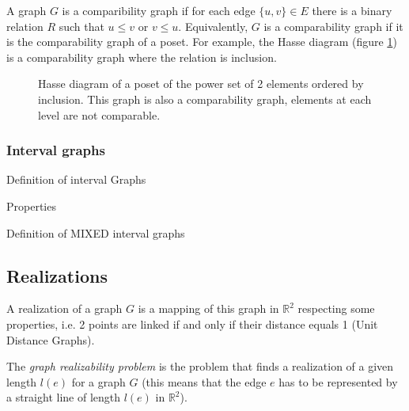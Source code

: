 \begin{defn}
  A graph $G$ is a comparibility graph if for each edge $\{u,v\} \in E$ there is
  a binary relation $R$ such that $u \leq v$ or $v \leq u$. Equivalently, $G$
  is a comparability graph if it is the comparability graph of a poset. For
  example, the Hasse diagram (figure \ref{fig:hasse}) is a comparability graph
  where the relation is inclusion.
\end{defn}

\begin{figure}
\centering

\begin{scaletikzpicturetowidth}{\textwidth}
\end{scaletikzpicturetowidth}

\caption{Hasse diagram of a poset of the power set of 2 elements ordered by inclusion.
This graph is also a comparability graph, elements at each level are not comparable.}
\label{fig:hasse}
\end{figure}

\subsubsection{Interval graphs}

Definition of interval Graphs

Properties

Definition of MIXED interval graphs


\subsection{Realizations}

\begin{defn}
  A realization of a graph $G$ is a mapping of this graph in $\mathbb{R}^2$
  respecting some properties, i.e. 2 points are linked if and only if
  their distance equals 1 (Unit Distance Graphs).
\end{defn}

The \textit{graph realizability problem} is the problem that finds a realization
of a given length $l(e)$ for a graph $G$ (this means that the edge $e$ has to
be represented by a straight line of length $l(e)$ in $\mathbb{R}^2$).

